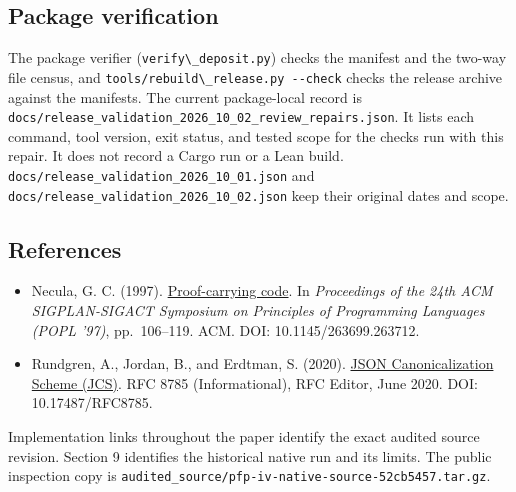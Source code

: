 \documentclass[
  11pt,
]{article}
\newcommand{\passthrough}[1]{#1}
\providecommand{\tightlist}{%
  \setlength{\itemsep}{0pt}\setlength{\parskip}{0pt}}
\begin{document}
\subsection{Package verification}\label{package-verification}

The package verifier (\passthrough{\lstinline!verify\_deposit.py!})
checks the manifest and the two-way file census, and
\passthrough{\lstinline!tools/rebuild\_release.py --check!} checks the
release archive against the manifests. The current package-local record
is \nolinkurl{docs/release_validation_2026_10_02_review_repairs.json}.
It lists each command, tool version, exit status, and tested scope for
the checks run with this repair. It does not record a Cargo run or a
Lean build. \nolinkurl{docs/release_validation_2026_10_01.json} and
\nolinkurl{docs/release_validation_2026_10_02.json} keep their original
dates and scope.

\subsection{References}\label{references}

\begin{itemize}
\tightlist
\item
  Necula, G. C. (1997).
  \href{https://doi.org/10.1145/263699.263712}{Proof-carrying code}. In
  \emph{Proceedings of the 24th ACM SIGPLAN-SIGACT Symposium on
  Principles of Programming Languages (POPL '97)}, pp.~106--119. ACM.
  DOI: 10.1145/263699.263712.
\item
  Rundgren, A., Jordan, B., and Erdtman, S. (2020).
  \href{https://doi.org/10.17487/RFC8785}{JSON Canonicalization Scheme
  (JCS)}. RFC 8785 (Informational), RFC Editor, June 2020. DOI:
  10.17487/RFC8785.
\end{itemize}

Implementation links throughout the paper identify the exact audited
source revision. Section 9 identifies the historical native run and its
limits. The public inspection copy is
\nolinkurl{audited_source/pfp-iv-native-source-52cb5457.tar.gz}.
\end{document}
